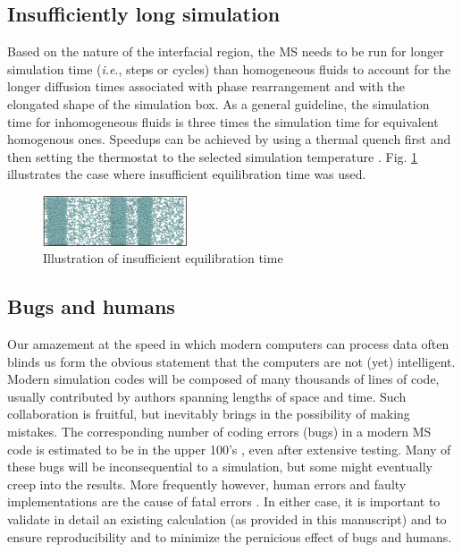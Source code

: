 \documentclass[9pt,tutorial]{livecoms}
\begin{document}
\subsection{Insufficiently long simulation} 

Based on the nature of the interfacial region, the MS needs to be run for
longer simulation time (\textit{i.e}., steps or cycles) than homogeneous fluids
to account for the longer diffusion times associated with phase rearrangement
and with the elongated shape of the simulation box. As a general guideline, the
simulation time for inhomogeneous fluids is three times the simulation time for
equivalent homogenous ones. Speedups can be achieved by using a thermal quench
first and then setting the thermostat to the selected simulation temperature
\citep{gelb2002}. Fig. \ref{fig:26} illustrates the case where insufficient equilibration time was
used.

\begin{figure}
\includegraphics[width=0.38\textwidth]{gfx/image77.png}
\caption{Illustration of insufficient equilibration time}
\label{fig:26}
\end{figure}

\subsection{Bugs and humans}\label{sec:bugs}

Our amazement at the speed in which modern computers can process data often
blinds us form the obvious statement that the computers are not (yet)
intelligent. Modern simulation codes will be composed of many thousands of
lines of code, usually contributed by authors spanning lengths of space and
time. Such collaboration is fruitful, but inevitably brings in the possibility
of making mistakes. The corresponding number of coding errors (bugs) in
a modern MS code is estimated to be in the upper 100's \citep{schappals2017},
even after extensive
testing. Many of these bugs will be inconsequential to a simulation, but some
might eventually creep into the results. More frequently however, human errors
and faulty implementations are the cause of fatal errors
\citep{wong2016}. In either case, it is important to validate in
detail an existing calculation (as provided in this manuscript) and to ensure
reproducibility and to minimize the pernicious effect of bugs and humans.  
\end{document}
